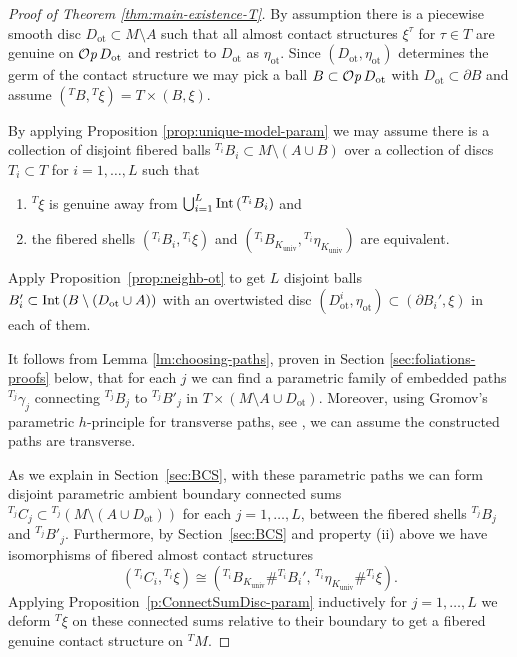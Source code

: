 \documentclass[12pt]{paper}
\theoremstyle{plain}
\theoremstyle{definition}
\newcommand{\p}{\partial}
\newcommand{\Int}{{\rm Int\,}} %
\newcommand{\univ}{\mathrm{univ}}
\newcommand{\ot}{\mathrm{ot}}
\def\Op{{\mathcal O}{\it p}\,}
\numberwithin{figure}{section}
\begin{document}
\begin{proof}[Proof of Theorem \ref{thm:main-existence-T}]
By assumption there is a piecewise smooth disc $D_\ot\subset M\setminus A$ such that all almost  contact structures 
$\xi^\tau$ for $\tau\in T$ are genuine on $\Op D_\ot$ and restrict to $D_\ot$ as $\eta_{\ot}$.  
Since $(D_\ot, \eta_{\ot})$ determines the germ of the contact structure we may pick a ball $B \subset \Op D_\ot$
with $D_\ot \subset \p B$ and assume $({}^{T} B, {}^T \xi) = T \times (B, \xi)$.
 

By applying Proposition \ref{prop:unique-model-param} we may assume
there is a collection of disjoint  fibered balls ${}^{T_i}B_i \subset M \setminus (A \cup B)$ over a collection of discs $T_i \subset T$ 
for $i = 1, \dots, L$ such that 
\begin{enumerate}
\item ${}^T\xi$ is genuine away from $\bigcup_{i=1}^L \Int({}^{T_i}B_i)$ and
\item the fibered shells
$({}^{T_i}B_i, {}^{T_i}\xi)$ and $({}^{T_i}B_{K_{\univ}}, {}^{T_i}\eta_{K_\univ})$ are equivalent.
\end{enumerate}
Apply Proposition~\ref{prop:neighb-ot} to get $L$ disjoint balls 
$B_i' \subset \Int(B\setminus (D_\ot\cup A))$  with an overtwisted disc 
 $(D^i_{\ot}, \eta_{\ot}) \subset (\p B_i', \xi)$ in each of them. 
 
 It follows from Lemma \ref{lm:choosing-paths}, proven in Section \ref{sec:foliations-proofs} below, that for each $j$ we can find
 a parametric family of embedded paths $^{T_j}\gamma_j$ connecting $^{T_j}B_j$ to $^{T_j}B'_j$ in $T\times(M\setminus A\cup D_\ot)$.    Moreover, using Gromov's parametric $h$-principle for transverse paths, see \cite{Gr-PDR}, we can assume the constructed paths are transverse. 

 
As we explain in Section~\ref{sec:BCS}, with these parametric paths we can form disjoint parametric 
ambient boundary connected sums ${}^{T_j}C_j \subset {}^{T_j}(M \setminus (A \cup D_\ot))$ for each $j=1, \dots, L$,
between the fibered shells $^{T_j}B_j$ and $^{T_j}B'_j$.  Furthermore, by Section~\ref{sec:BCS}
and property (ii) above we have isomorphisms of fibered almost contact structures
$$
	({}^{T_i}C_i, {}^{T_i}\xi) \cong ({}^{T_i}B_{K_\univ} \# {}^{T_i}B_i',\, {}^{T_i}\eta_{K_\univ} \# {}^{T_i}\xi).
$$
Applying Proposition~\ref{p:ConnectSumDisc-param} inductively for $j=1,\dots, L$  we  deform ${}^T\xi$ on these connected sums relative to their boundary
to get a fibered genuine contact structure on ${}^{T}M$.
\end{proof}
\medskip
\end{document}
